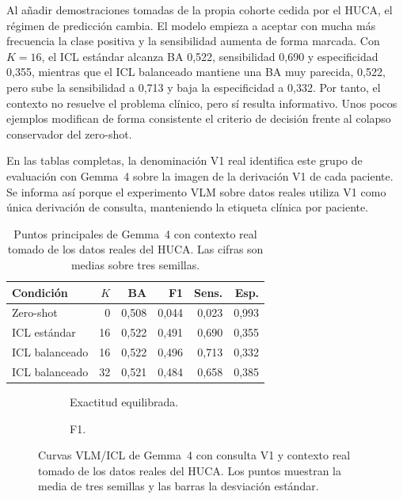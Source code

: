 Al añadir demostraciones tomadas de la propia cohorte cedida por el HUCA, el régimen de predicción cambia. El modelo empieza a aceptar con mucha más frecuencia la clase positiva y la sensibilidad aumenta de forma marcada. Con \(K=16\), el ICL estándar alcanza BA 0,522, sensibilidad 0,690 y especificidad 0,355, mientras que el ICL balanceado mantiene una BA muy parecida, 0,522, pero sube la sensibilidad a 0,713 y baja la especificidad a 0,332. Por tanto, el contexto no resuelve el problema clínico, pero sí resulta informativo. Unos pocos ejemplos modifican de forma consistente el criterio de decisión frente al colapso conservador del zero-shot.

En las tablas completas, la denominación V1 real identifica este grupo de evaluación con Gemma~4 sobre la imagen de la derivación V1 de cada paciente. Se informa así porque el experimento VLM sobre datos reales utiliza V1 como única derivación de consulta, manteniendo la etiqueta clínica por paciente.

\begin{table}[H]
  \centering
  \small
  \begin{tabularx}{0.94\textwidth}{p{3.7cm}rrrrr}
    \toprule
    Condición & \(K\) & BA & F1 & Sens. & Esp. \\
    \midrule
    Zero-shot & 0  & 0,508 & 0,044 & 0,023 & 0,993 \\
    ICL estándar & 16 & 0,522 & 0,491 & 0,690 & 0,355 \\
    ICL balanceado & 16 & 0,522 & 0,496 & 0,713 & 0,332 \\
    ICL balanceado & 32 & 0,521 & 0,484 & 0,658 & 0,385 \\
    \bottomrule
  \end{tabularx}
  \caption{Puntos principales de Gemma~4 con contexto real tomado de los datos reales del HUCA. Las cifras son medias sobre tres semillas.}
  \label{tab:vlm_huca_key}
\end{table}

\begin{figure}[H]
  \centering
  \begin{subfigure}{0.48\textwidth}
    \centering
    \caption{Exactitud equilibrada.}
  \end{subfigure}
  \hfill
  \begin{subfigure}{0.48\textwidth}
    \centering
    \caption{F1.}
  \end{subfigure}
  \caption{Curvas VLM/ICL de Gemma~4 con consulta V1 y contexto real tomado de los datos reales del HUCA. Los puntos muestran la media de tres semillas y las barras la desviación estándar.}
  \label{fig:vlm_huca_curves}
\end{figure}

